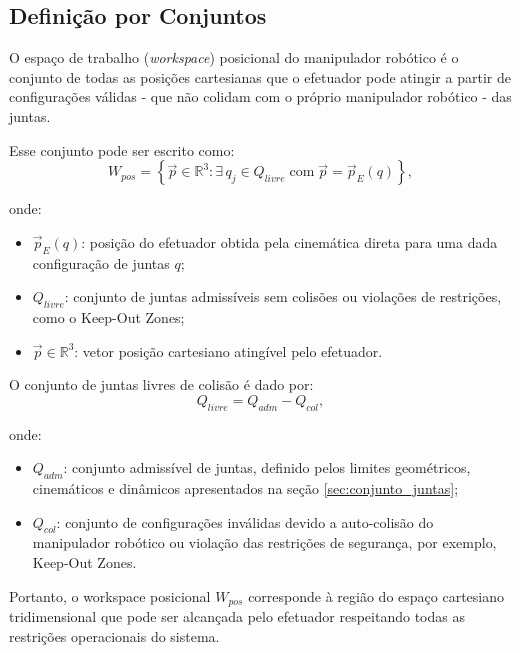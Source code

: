\subsection{Definição por Conjuntos}
\label{sec:definicao_conjuntos}

O espaço de trabalho (\emph{workspace}) posicional do manipulador robótico é o conjunto de todas as posições cartesianas que o efetuador pode atingir a partir de configurações válidas - que não colidam com o próprio manipulador robótico - das juntas.  

Esse conjunto pode ser escrito como:
\begin{equation}
\label{eq:workspace_posicional}
W_{pos} = \left\{ \vec{p} \in \mathbb{R}^3 : \exists \, q_j \in Q_{livre} \; \text{com} \; \vec{p} = \vec{p}_E(q) \right\},
\end{equation}

onde:
\begin{itemize}
    \item $\vec{p}_E(q)$: posição do efetuador obtida pela cinemática direta para uma dada configuração de juntas $q$;
    \item $Q_{livre}$: conjunto de juntas admissíveis sem colisões ou violações de restrições, como o Keep-Out Zones;
    \item $\vec{p} \in \mathbb{R}^3$: vetor posição cartesiano atingível pelo efetuador.
\end{itemize}

O conjunto de juntas livres de colisão é dado por:
\begin{equation}
\label{eq:workspace_Qlivre}
Q_{livre} = Q_{adm} - Q_{col},
\end{equation}

onde:
\begin{itemize}
    \item $Q_{adm}$: conjunto admissível de juntas, definido pelos limites geométricos, cinemáticos e dinâmicos apresentados na seção \eqref{sec:conjunto_juntas};
    \item $Q_{col}$: conjunto de configurações inválidas devido a auto-colisão do manipulador robótico ou violação das restrições de segurança, por exemplo, Keep-Out Zones.
\end{itemize}

Portanto, o workspace posicional $W_{pos}$ corresponde à região do espaço cartesiano tridimensional que pode ser alcançada pelo efetuador respeitando todas as restrições operacionais do sistema.
